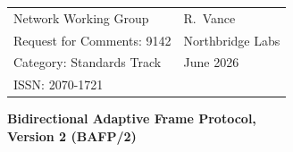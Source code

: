\documentclass[11pt]{article}
\begin{document}
\begin{tabularx}{\linewidth}{@{}p{7.5cm} X@{}}
{\ttfamily\small Network Working Group} & \hfill{\ttfamily\small R.\ Vance}\\
{\ttfamily\small Request for Comments: 9142} & \hfill{\ttfamily\small Northbridge Labs}\\
{\ttfamily\small Category: Standards Track} & \hfill{\ttfamily\small June 2026}\\
{\ttfamily\small ISSN: 2070-1721} & \hfill{\ttfamily\small}\\
\end{tabularx}

\vspace{6pt}
\begin{center}
{\Large\bfseries\color{ink} Bidirectional Adaptive Frame Protocol,\\ Version 2 (BAFP/2)}
\end{center}










\end{document}
